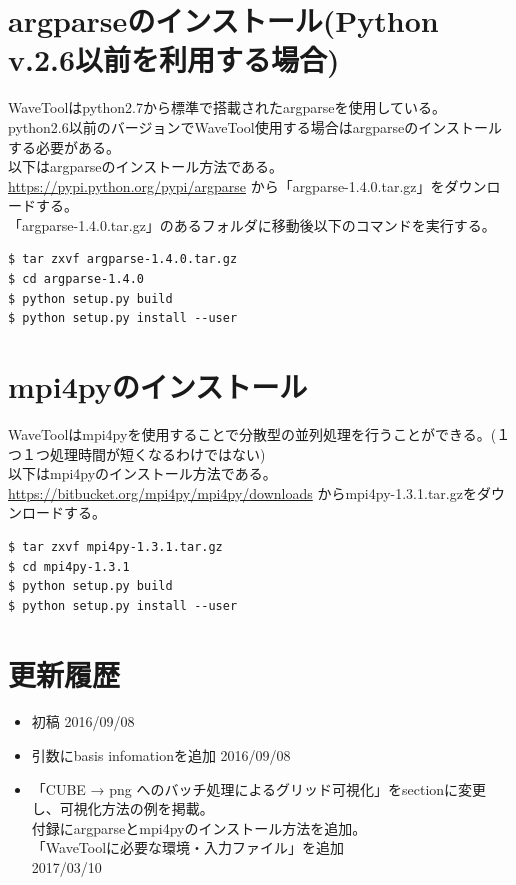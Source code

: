 \documentclass{jsarticle}
\begin{document}



\newpage
\appendix

\section{argparseのインストール(Python v.2.6以前を利用する場合)}
	\label{sec:argparseのインストール}
WaveToolはpython2.7から標準で搭載されたargparseを使用している。\\
python2.6以前のバージョンでWaveTool使用する場合はargparseのインストールする必要がある。\\
以下はargparseのインストール方法である。\\

\url{https://pypi.python.org/pypi/argparse}
から「argparse-1.4.0.tar.gz」をダウンロードする。\\
「argparse-1.4.0.tar.gz」のあるフォルダに移動後以下のコマンドを実行する。
\begin{Verbatim}[frame=single]
$ tar zxvf argparse-1.4.0.tar.gz
$ cd argparse-1.4.0
$ python setup.py build
$ python setup.py install --user
\end{Verbatim}

\newpage
\section{mpi4pyのインストール}
	\label{sec:mpi4pyのインストール}
WaveToolはmpi4pyを使用することで分散型の並列処理を行うことができる。(１つ１つ処理時間が短くなるわけではない)\\
以下はmpi4pyのインストール方法である。\\

\url{https://bitbucket.org/mpi4py/mpi4py/downloads}
からmpi4py-1.3.1.tar.gzをダウンロードする。
\begin{Verbatim}[frame=single]
$ tar zxvf mpi4py-1.3.1.tar.gz
$ cd mpi4py-1.3.1
$ python setup.py build
$ python setup.py install --user
\end{Verbatim}

\newpage

\section{更新履歴}
\begin{itemize}
\item 初稿 2016/09/08 
\item 引数にbasis infomationを追加 2016/09/08 
\item 「CUBE → png へのバッチ処理によるグリッド可視化」をsectionに変更し、可視化方法の例を掲載。\\
付録にargparseとmpi4pyのインストール方法を追加。\\
「WaveToolに必要な環境・入力ファイル」を追加\\
2017/03/10\\


\end{itemize}
\end{document}
